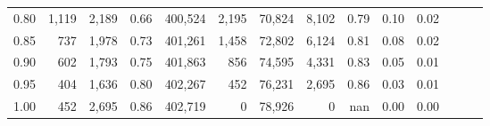 \begin{tabular}{rrrrrrrrrrrrrr}
0.80 &    1,119 &  2,189 &  0.66 &  400,524 &    2,195 &  70,824 &   8,102 &  0.79 &  0.10 &      0.02 \\
0.85 &      737 &  1,978 &  0.73 &  401,261 &    1,458 &  72,802 &   6,124 &  0.81 &  0.08 &      0.02 \\
0.90 &      602 &  1,793 &  0.75 &  401,863 &      856 &  74,595 &   4,331 &  0.83 &  0.05 &      0.01 \\
0.95 &      404 &  1,636 &  0.80 &  402,267 &      452 &  76,231 &   2,695 &  0.86 &  0.03 &      0.01 \\
1.00 &      452 &  2,695 &  0.86 &  402,719 &        0 &  78,926 &       0 &   nan &  0.00 &      0.00 \\
\bottomrule
\end{tabular}
